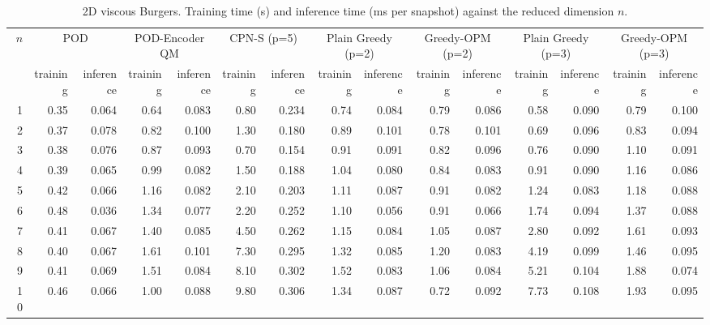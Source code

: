 \begin{table}[tb]
  \centering
  \caption{2D viscous Burgers. Training time (s) and inference time (ms per snapshot) against the reduced dimension \( n \).}
  \label{tab:burgers2d_timings}
  \small
  \setlength{\tabcolsep}{4pt}
  \begin{tabular}{rrrrrrrrrrrrrrr}
    \toprule
    \multirow{2}{*}{\( n \)} & \multicolumn{2}{c}{POD} & \multicolumn{2}{c}{POD-Encoder QM} & \multicolumn{2}{c}{CPN-S (p=5)} & \multicolumn{2}{c}{Plain Greedy (p=2)} & \multicolumn{2}{c}{Greedy-OPM (p=2)} & \multicolumn{2}{c}{Plain Greedy (p=3)} & \multicolumn{2}{c}{Greedy-OPM (p=3)} \\
    \cmidrule(lr){2-3} \cmidrule(lr){4-5} \cmidrule(lr){6-7} \cmidrule(lr){8-9} \cmidrule(lr){10-11} \cmidrule(lr){12-13} \cmidrule(lr){14-15}
     & training & inference & training & inference & training & inference & training & inference & training & inference & training & inference & training & inference \\
    \midrule
    1 & 0.35 & 0.064 & 0.64 & 0.083 & 0.80 & 0.234 & 0.74 & 0.084 & 0.79 & 0.086 & 0.58 & 0.090 & 0.79 & 0.100 \\
    2 & 0.37 & 0.078 & 0.82 & 0.100 & 1.30 & 0.180 & 0.89 & 0.101 & 0.78 & 0.101 & 0.69 & 0.096 & 0.83 & 0.094 \\
    3 & 0.38 & 0.076 & 0.87 & 0.093 & 0.70 & 0.154 & 0.91 & 0.091 & 0.82 & 0.096 & 0.76 & 0.090 & 1.10 & 0.091 \\
    4 & 0.39 & 0.065 & 0.99 & 0.082 & 1.50 & 0.188 & 1.04 & 0.080 & 0.84 & 0.083 & 0.91 & 0.090 & 1.16 & 0.086 \\
    5 & 0.42 & 0.066 & 1.16 & 0.082 & 2.10 & 0.203 & 1.11 & 0.087 & 0.91 & 0.082 & 1.24 & 0.083 & 1.18 & 0.088 \\
    6 & 0.48 & 0.036 & 1.34 & 0.077 & 2.20 & 0.252 & 1.10 & 0.056 & 0.91 & 0.066 & 1.74 & 0.094 & 1.37 & 0.088 \\
    7 & 0.41 & 0.067 & 1.40 & 0.085 & 4.50 & 0.262 & 1.15 & 0.084 & 1.05 & 0.087 & 2.80 & 0.092 & 1.61 & 0.093 \\
    8 & 0.40 & 0.067 & 1.61 & 0.101 & 7.30 & 0.295 & 1.32 & 0.085 & 1.20 & 0.083 & 4.19 & 0.099 & 1.46 & 0.095 \\
    9 & 0.41 & 0.069 & 1.51 & 0.084 & 8.10 & 0.302 & 1.52 & 0.083 & 1.06 & 0.084 & 5.21 & 0.104 & 1.88 & 0.074 \\
    10 & 0.46 & 0.066 & 1.00 & 0.088 & 9.80 & 0.306 & 1.34 & 0.087 & 0.72 & 0.092 & 7.73 & 0.108 & 1.93 & 0.095 \\
    \bottomrule
  \end{tabular}
\end{table}
